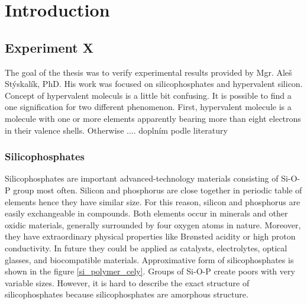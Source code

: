 \documentclass[
  digital, %
  table,   %
  lof,     %
  lot,     %
]{fithesis3}
\begin{document}
\chapter{Introduction}

\section{Experiment  X}
The goal of the thesis was to verify experimental results provided by Mgr. Aleš Stýskalík, PhD. His work was focused on silicophosphates and hypervalent silicon. Concept of hypervalent moleculs is a little bit confusing. It is possible to find a one signification for two different phenomenon. First, hypervalent molecule is a molecule with one or more elements apparently bearing more than eight electrons in their valence shells. Otherwise .... doplním podle literatury
\subsection{Silicophosphates}
Silicophosphates are important advanced-technology materials consisting of Si-O-P group most often. Silicon and phosphorus are close together in periodic table of elements hence they have similar size. For this reason, silicon and phosphorus are easily exchangeable in compounds. Both elements occur in minerals and other oxidic materials, generally surrounded by four oxygen atoms in nature. Moreover, they have extraordinary physical properties like Brønsted acidity or high proton conductivity. In future they could be applied as catalysts, electrolytes, optical glasses, and biocompatible materials. Approximative form of silicophosphates is shown in the figure \ref{si_polymer_cely}. \cite{Styskalik2015thesis} Groups of Si-O-P create poors with very variable sizes. However, it is hard to describe the exact structure of silicophosphates because silicophosphates are amorphous structure.
\end{document}
